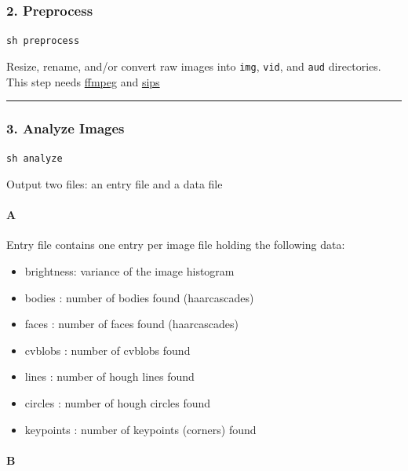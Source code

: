 \hypertarget{preprocess}{%
\subsubsection{2. Preprocess}\label{preprocess}}

\texttt{sh\ preprocess}

Resize, rename, and/or convert raw images into \texttt{img}, \texttt{vid}, and \texttt{aud} directories. This step needs \href{https://ffmpeg.org/ffmpeg.html}{ffmpeg} and \href{https://ss64.com/osx/sips.html}{sips}

\begin{center}\rule{0.5\linewidth}{\linethickness}\end{center}

\hypertarget{analyze-images}{%
\subsubsection{3. Analyze Images}\label{analyze-images}}

\texttt{sh\ analyze}

Output two files: an entry file and a data file

\hypertarget{a}{%
\paragraph{A}\label{a}}

Entry file contains one entry per image file holding the following data:

\begin{itemize}
\tightlist
\item
  brightness: variance of the image histogram
\item
  bodies : number of bodies found (haarcascades)
\item
  faces : number of faces found (haarcascades)
\item
  cvblobs : number of cvblobs found
\item
  lines : number of hough lines found
\item
  circles : number of hough circles found
\item
  keypoints : number of keypoints (corners) found
\end{itemize}

\hypertarget{b}{%
\paragraph{B}\label{b}}

